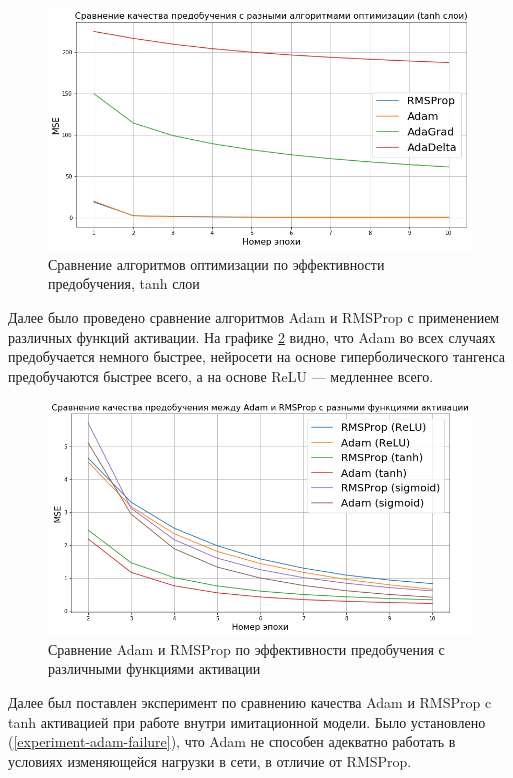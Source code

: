 \documentclass[specification, annotation]{itmo-student-thesis}
\begin{document}
\begin{figure}[!h]
  \caption{Сравнение алгоритмов оптимизации по эффективности
    предобучения, tanh слои}\label{experiment-optimizers-pretrain-tanh}
  \centering
  \includegraphics[scale=0.6]{experiment-optimizers-pretrain-tanh}
\end{figure}

Далее было проведено сравнение алгоритмов Adam и RMSProp с применением различных
функций активации. На графике
\ref{experiment-optimizers-pretrain-adam-vs-rmsprop} видно, что Adam во всех
случаях предобучается немного быстрее, нейросети на основе гиперболического
тангенса предобучаются быстрее всего, а на основе ReLU --- медленнее всего.

\begin{figure}[!h]
  \caption{Сравнение Adam и RMSProp по эффективности предобучения с различными
    функциями активации}\label{experiment-optimizers-pretrain-adam-vs-rmsprop}
  \centering
  \includegraphics[scale=0.6]{experiment-optimizers-pretrain-adam-vs-rmsprop}
\end{figure}

Далее был поставлен эксперимент по сравнению качества Adam и RMSProp c tanh
активацией при работе внутри имитационной модели. Было установлено
(\ref{experiment-adam-failure}), что Adam не способен адекватно работать в
условиях изменяющейся нагрузки в сети, в отличие от RMSProp.
\end{document}
